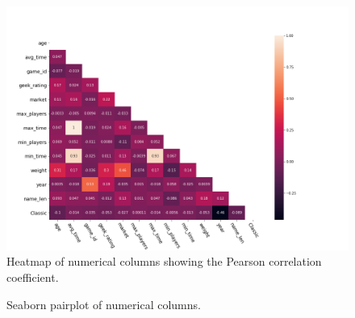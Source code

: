 \documentclass[12pt]{article}
\begin{document}
\begin{figure}[ht]
\includegraphics[width=20cm]{ranked_df_heatmap.png}
\caption{\small Heatmap of numerical columns showing the Pearson correlation coefficient.}
\end{figure}

\begin{figure}[ht]
\centering
{}
\caption{\small Seaborn pairplot of numerical columns.}
\end{figure}
\end{document}
